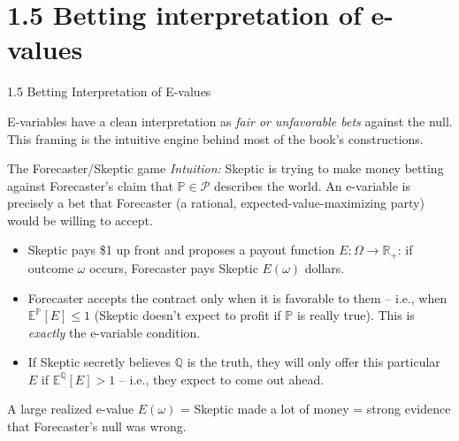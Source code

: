\documentclass[aspectratio=169,10pt]{beamer}
\begin{document}
\section{1.5 Betting interpretation of e-values}

\begin{frame}{1.5 Betting Interpretation of E-values}

E-variables have a clean interpretation as \emph{fair or unfavorable bets}
against the null. This framing is the intuitive engine behind most of the
book's constructions.

\begin{block}{The Forecaster/Skeptic game}
\emph{Intuition:} Skeptic is trying to make money betting against
Forecaster's claim that $\mathbb{P}\in\mathcal{P}$ describes the world.
An e-variable is precisely a bet that Forecaster (a rational,
expected-value-maximizing party) would be willing to accept.

\begin{itemize}
  \item Skeptic pays \$1 up front and proposes a payout function
    $E:\Omega\to\mathbb{R}_+$: if outcome $\omega$ occurs, Forecaster pays
    Skeptic $E(\omega)$ dollars.
  \item Forecaster accepts the contract only when it is favorable to them
    -- i.e., when $\mathbb{E}^{\mathbb{P}}[E]\le 1$ (Skeptic doesn't expect
    to profit if $\mathbb{P}$ is really true). This is \emph{exactly}
    the e-variable condition.
  \item If Skeptic secretly believes $\mathbb{Q}$ is the truth, they will
    only offer this particular $E$ if $\mathbb{E}^{\mathbb{Q}}[E]>1$ --
    i.e., they expect to come out ahead.
\end{itemize}
\end{block}

A large realized e-value $E(\omega)$ = Skeptic made a lot of money = strong
evidence that Forecaster's null was wrong.

\end{frame}
\end{document}
